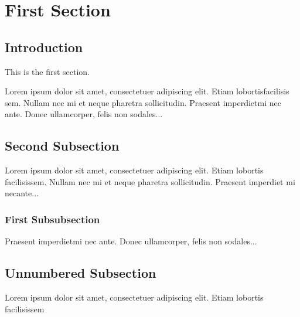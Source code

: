\documentclass[12pt]{article}
\begin{document}
\tableofcontents

\section{First Section}

\subsection{Introduction}

This is the first section.

Lorem  ipsum  dolor  sit  amet,  consectetuer  adipiscing  
elit.   Etiam  lobortisfacilisis sem.  Nullam nec mi et 
neque pharetra sollicitudin.  Praesent imperdietmi nec ante. 
Donec ullamcorper, felis non sodales...

\subsection{Second Subsection}

Lorem ipsum dolor sit amet, consectetuer adipiscing elit.  
Etiam lobortis facilisissem.  Nullam nec mi et neque pharetra 
sollicitudin.  Praesent imperdiet mi necante...

\subsubsection{First Subsubsection}
Praesent imperdietmi nec ante. Donec ullamcorper, felis non sodales...

\subsection*{Unnumbered Subsection}
Lorem ipsum dolor sit amet, consectetuer adipiscing elit.  
Etiam lobortis facilisissem
\end{document}
